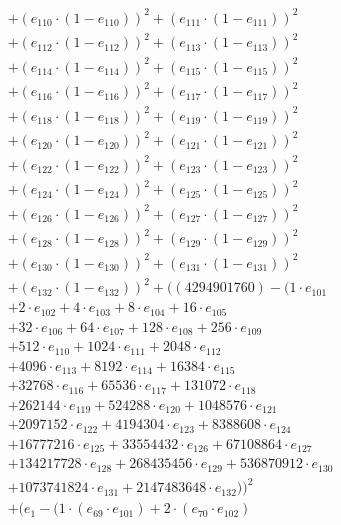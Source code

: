 \documentclass[10pt, a4paper]{article}
\begin{document}
\begin{align*}
& + (e_{110} \cdot (1 - e_{110}))^{2} + (e_{111} \cdot (1 - e_{111}))^{2} \\
& + (e_{112} \cdot (1 - e_{112}))^{2} + (e_{113} \cdot (1 - e_{113}))^{2} \\
& + (e_{114} \cdot (1 - e_{114}))^{2} + (e_{115} \cdot (1 - e_{115}))^{2} \\
& + (e_{116} \cdot (1 - e_{116}))^{2} + (e_{117} \cdot (1 - e_{117}))^{2} \\
& + (e_{118} \cdot (1 - e_{118}))^{2} + (e_{119} \cdot (1 - e_{119}))^{2} \\
& + (e_{120} \cdot (1 - e_{120}))^{2} + (e_{121} \cdot (1 - e_{121}))^{2} \\
& + (e_{122} \cdot (1 - e_{122}))^{2} + (e_{123} \cdot (1 - e_{123}))^{2} \\
& + (e_{124} \cdot (1 - e_{124}))^{2} + (e_{125} \cdot (1 - e_{125}))^{2} \\
& + (e_{126} \cdot (1 - e_{126}))^{2} + (e_{127} \cdot (1 - e_{127}))^{2} \\
& + (e_{128} \cdot (1 - e_{128}))^{2} + (e_{129} \cdot (1 - e_{129}))^{2} \\
& + (e_{130} \cdot (1 - e_{130}))^{2} + (e_{131} \cdot (1 - e_{131}))^{2} \\
& + (e_{132} \cdot (1 - e_{132}))^{2} + ((4294901760) - (1 \cdot e_{101} \\
& + 2 \cdot e_{102} + 4 \cdot e_{103} + 8 \cdot e_{104} + 16 \cdot e_{105} \\
& + 32 \cdot e_{106} + 64 \cdot e_{107} + 128 \cdot e_{108} + 256 \cdot e_{109} \\
& + 512 \cdot e_{110} + 1024 \cdot e_{111} + 2048 \cdot e_{112} \\
& + 4096 \cdot e_{113} + 8192 \cdot e_{114} + 16384 \cdot e_{115} \\
& + 32768 \cdot e_{116} + 65536 \cdot e_{117} + 131072 \cdot e_{118} \\
& + 262144 \cdot e_{119} + 524288 \cdot e_{120} + 1048576 \cdot e_{121} \\
& + 2097152 \cdot e_{122} + 4194304 \cdot e_{123} + 8388608 \cdot e_{124} \\
& + 16777216 \cdot e_{125} + 33554432 \cdot e_{126} + 67108864 \cdot e_{127} \\
& + 134217728 \cdot e_{128} + 268435456 \cdot e_{129} + 536870912 \cdot e_{130} \\
& + 1073741824 \cdot e_{131} + 2147483648 \cdot e_{132}))^{2} \\
& + (e_{1} - (1 \cdot (e_{69} \cdot e_{101}) + 2 \cdot (e_{70} \cdot e_{102}) \\

\end{align*}
\end{document}
